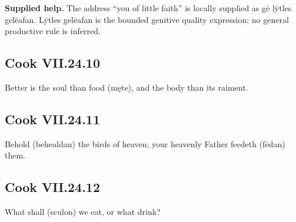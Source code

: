 \textbf{Supplied help.} The address “you of little faith” is locally supplied as gē lȳtles gelēafan. Lȳtles gelēafan is the bounded genitive quality expression; no general productive rule is inferred.

\par\begin{minipage}{\linewidth}\raggedright
\subsection*{Cook VII.24.10}

Better is the soul than food (męte), and the body than its raiment.

\end{minipage}\par\addvspace{4pt}

\par\begin{minipage}{\linewidth}\raggedright
\subsection*{Cook VII.24.11}

Behold (behealdan) the birds of heaven; your heavenly Father feedeth (fēdan) them.

\end{minipage}\par\addvspace{4pt}

\par\begin{minipage}{\linewidth}\raggedright
\subsection*{Cook VII.24.12}

What shall (sculon) we eat, or what drink?

\end{minipage}\par\addvspace{4pt}

